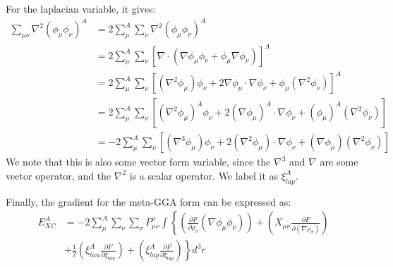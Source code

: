 For the laplacian variable, it gives:
\begin{equation}
 \begin{split}
  \sum_{\mu\nu}\nabla^{2}(\phi_{\mu}\phi_{\nu})^{A} &= 
  2\sum_{\mu}^{A}\sum_{\nu}\nabla^{2}(\phi_{\mu}\phi_{\nu})^{A} \\ 
  &= 
  2\sum_{\mu}^{A}\sum_{\nu}\left[
\nabla\cdotp(\nabla\phi_{\mu}\phi_{\nu} +
\phi_{\mu}\nabla\phi_{\nu})\right]^{A} \\
   &= 2\sum_{\mu}^{A}\sum_{\nu}\left[
(\nabla^{2}\phi_{\mu})\phi_{\nu} +
2\nabla\phi_{\mu}\cdotp\nabla\phi_{\nu} +
\phi_{\mu}(\nabla^{2}\phi_{\nu})\right]^{A} \\
&=2\sum_{\mu}^{A}\sum_{\nu}\left[
(\nabla^{2}\phi_{\mu})^{A}\phi_{\nu} +
2(\nabla\phi_{\mu})^{A}\cdotp\nabla\phi_{\nu} +
(\phi_{\mu})^{A}(\nabla^{2}\phi_{\nu})\right] \\
&=-2\sum_{\mu}^{A}\sum_{\nu}\left[
(\nabla^{3}\phi_{\mu})\phi_{\nu} +
2(\nabla^{2}\phi_{\mu})\cdotp\nabla\phi_{\nu} +
(\nabla\phi_{\mu})(\nabla^{2}\phi_{\nu})\right] 
 \end{split}
\label{functional_meta_gga_gradient_eq:4}
\end{equation} 
We note that this is also some vector form variable, since the
$\nabla^{3}$ and $\nabla$ are some vector operator, and the
$\nabla^{2}$ is a scalar operator. We label it as $\xi_{lap}^{A}$.

Finally, the gradient for the meta-GGA form can be expressed as:
\begin{equation}
 \label{functional_meta_gga_gradient_eq:4}
\begin{split}
E_{XC}^{A} &= -2\sum_{\mu}^{A}\sum_{\nu}\sum_{\sigma}
P_{\mu\nu}^{\sigma}\int\left\lbrace
\left(
\frac{\partial F}{\partial \rho_{\sigma}}(\nabla\phi_{\mu}\phi_{\nu
})\right) + \left(
    X_{\mu\nu}\frac{\partial F}{\partial (\nabla\rho_{\sigma})}
\right)
\right. \\
&\left. + 
 \frac{1}{2}\left(
    \xi_{tau}^{A}\frac{\partial F}{\partial \xi_{tau}}\right) +
 \left(
    \xi_{lap}^{A}\frac{\partial F}{\partial \xi_{lap}}\right)
    \right\rbrace  d^{3}r 
\end{split}
\end{equation}   


